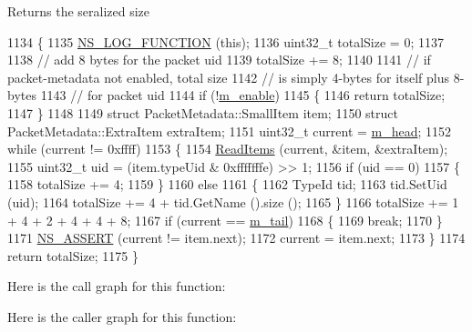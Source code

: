 \begin{DoxyReturn}{Returns}
the seralized size 
\end{DoxyReturn}

\begin{DoxyCode}
1134 \{
1135   \hyperlink{log-macros-disabled_8h_a90b90d5bad1f39cb1b64923ea94c0761}{NS\_LOG\_FUNCTION} (\textcolor{keyword}{this});
1136   uint32\_t totalSize = 0;
1137 
1138   \textcolor{comment}{// add 8 bytes for the packet uid}
1139   totalSize += 8;
1140 
1141   \textcolor{comment}{// if packet-metadata not enabled, total size}
1142   \textcolor{comment}{// is simply 4-bytes for itself plus 8-bytes }
1143   \textcolor{comment}{// for packet uid}
1144   \textcolor{keywordflow}{if} (!\hyperlink{classns3_1_1PacketMetadata_a666ea556ffbd8f2226195cde1abe7ae7}{m\_enable})
1145     \{
1146       \textcolor{keywordflow}{return} totalSize;
1147     \}
1148 
1149   \textcolor{keyword}{struct }PacketMetadata::SmallItem item;
1150   \textcolor{keyword}{struct }PacketMetadata::ExtraItem extraItem;
1151   uint32\_t current = \hyperlink{classns3_1_1PacketMetadata_a46b3ef0a9a80a798ad1e81b5694a5658}{m\_head};
1152   \textcolor{keywordflow}{while} (current != 0xffff)
1153     \{
1154       \hyperlink{classns3_1_1PacketMetadata_a3719ad2c32313a9a1c74462322e8b517}{ReadItems} (current, &item, &extraItem);
1155       uint32\_t uid = (item.typeUid & 0xfffffffe) >> 1;
1156       \textcolor{keywordflow}{if} (uid == 0)
1157         \{
1158           totalSize += 4;
1159         \}
1160       \textcolor{keywordflow}{else}
1161         \{
1162           TypeId tid;
1163           tid.SetUid (uid);
1164           totalSize += 4 + tid.GetName ().size ();
1165         \}
1166       totalSize += 1 + 4 + 2 + 4 + 4 + 8;
1167       \textcolor{keywordflow}{if} (current == \hyperlink{classns3_1_1PacketMetadata_ad24a659e236af7b98c475c97c4f60db9}{m\_tail})
1168         \{
1169           \textcolor{keywordflow}{break};
1170         \}
1171       \hyperlink{assert_8h_a6dccdb0de9b252f60088ce281c49d052}{NS\_ASSERT} (current != item.next);
1172       current = item.next;
1173     \}
1174   \textcolor{keywordflow}{return} totalSize;
1175 \}
\end{DoxyCode}


Here is the call graph for this function\+:




Here is the caller graph for this function\+:


